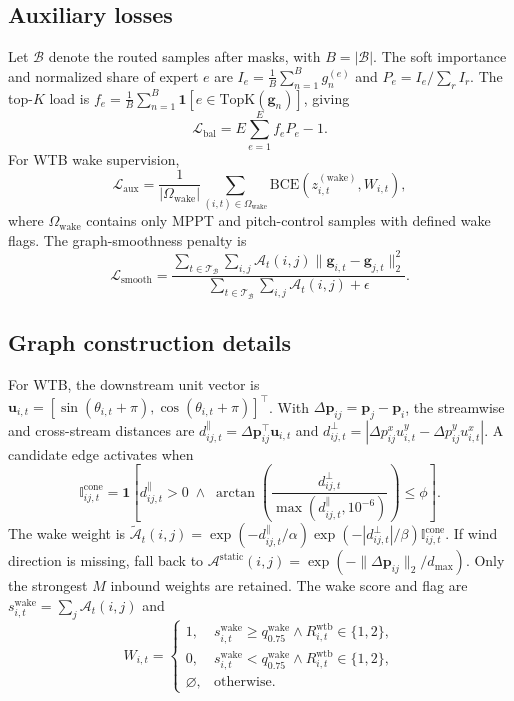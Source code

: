 \documentclass[
  11pt]{article}
\begin{document}
\subsection*{Auxiliary losses}\label{auxiliary-losses}

Let \(\mathcal{B}\) denote the routed samples after masks, with
\(B=|\mathcal{B}|\). The soft importance and normalized share of expert
\(e\) are \(I_e = \frac{1}{B}\sum_{n=1}^{B} g_n^{(e)}\) and
\(P_e = I_e / \sum_{r} I_r\). The top-\(K\) load is
\(f_e = \frac{1}{B}\sum_{n=1}^{B}\mathbf{1}[e \in \mathrm{TopK}(\mathbf{g}_n)]\),
giving \[\mathcal{L}_{\mathrm{bal}} = E\sum_{e=1}^{E} f_e P_e - 1.\] For
WTB wake supervision,
\[\mathcal{L}_{\mathrm{aux}} = \frac{1}{|\Omega_{\mathrm{wake}}|}\sum_{(i,t)\in\Omega_{\mathrm{wake}}}\mathrm{BCE}(z^{(\mathrm{wake})}_{i,t}, W_{i,t}),\]
where \(\Omega_{\mathrm{wake}}\) contains only MPPT and pitch-control
samples with defined wake flags. The graph-smoothness penalty is
\[\mathcal{L}_{\mathrm{smooth}} = \frac{\sum_{t\in\mathcal{T}_{\mathcal{B}}}\sum_{i,j}\mathcal{A}_t(i,j)\lVert\mathbf{g}_{i,t}-\mathbf{g}_{j,t}\rVert_2^2}{\sum_{t\in\mathcal{T}_{\mathcal{B}}}\sum_{i,j}\mathcal{A}_t(i,j)+\epsilon}.\]

\subsection*{Graph construction
details}\label{graph-construction-details}

For WTB, the downstream unit vector is
\(\mathbf{u}_{i,t}=[\sin(\theta_{i,t}+\pi), \cos(\theta_{i,t}+\pi)]^{\top}\).
With \(\Delta\mathbf{p}_{ij}=\mathbf{p}_j-\mathbf{p}_i\), the streamwise
and cross-stream distances are
\(d^{\parallel}_{ij,t}=\Delta\mathbf{p}_{ij}^{\top}\mathbf{u}_{i,t}\)
and
\(d^{\perp}_{ij,t}=|\Delta p^x_{ij}u^y_{i,t}-\Delta p^y_{ij}u^x_{i,t}|\).
A candidate edge activates when
\[\mathbb{I}^{\mathrm{cone}}_{ij,t}=\mathbf{1}\!\left[d^{\parallel}_{ij,t}>0\;\land\;\arctan\!\left(\frac{d^{\perp}_{ij,t}}{\max(d^{\parallel}_{ij,t},10^{-6})}\right)\le\phi\right].\]
The wake weight is
\(\tilde{\mathcal{A}}_t(i,j)=\exp(-d^{\parallel}_{ij,t}/\alpha)\exp(-|d^{\perp}_{ij,t}|/\beta)\mathbb{I}^{\mathrm{cone}}_{ij,t}\).
If wind direction is missing, fall back to
\(\mathcal{A}^{\mathrm{static}}(i,j)=\exp(-\lVert\Delta\mathbf{p}_{ij}\rVert_2/d_{\max})\).
Only the strongest \(M\) inbound weights are retained. The wake score
and flag are \(s^{\mathrm{wake}}_{i,t}=\sum_{j}\mathcal{A}_t(i,j)\) and
\[W_{i,t}=\begin{cases}1,&s^{\mathrm{wake}}_{i,t}\ge q_{0.75}^{\mathrm{wake}}\land R^{\mathrm{wtb}}_{i,t}\in\{1,2\},\\0,&s^{\mathrm{wake}}_{i,t}<q_{0.75}^{\mathrm{wake}}\land R^{\mathrm{wtb}}_{i,t}\in\{1,2\},\\\varnothing,&\text{otherwise.}\end{cases}\]
\end{document}
